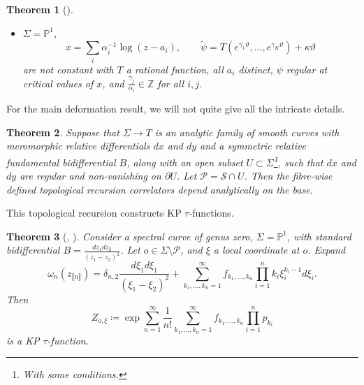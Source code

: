 \documentclass[10pt,a4paper,oneside,no-math,reqno]{amsart}%
\theoremstyle{plain}
\newtheorem{theorem}{Theorem}[section]
\theoremstyle{definition}
\theoremstyle{remark}
\numberwithin{equation}{section}
\renewcommand{\theta}{\vartheta}
\newcommand{\mb}[1]{\mathbb{#1}}
\newcommand{\mc}[1]{\mathcal{#1}}
\newcommand{\1}{\mathds{1}}
\newcommand{\Z}{\mb{Z}}
\renewcommand{\P}{\mb{P}}
\newcommand{\<}{\langle}
\renewcommand{\>}{\rangle}
\newcommand{\del}{\partial}
\begin{document}
\begin{theorem}[{\cite[Section 6]{ABDKS24}}]
\begin{itemize}
        are not constant with all $ a_i$ distinct and $ R $ a rational function which is regular at the $ a_i$. 
        \item $ \Sigma = \P^1$,
        \begin{equation}
            x
            = 
            \sum_i \alpha_i^{-1} \log (z - a_i),
            \qquad
            \tilde{\psi}  
            = 
            T ( e^{\gamma_1 \theta}, \dotsc, e^{\gamma_K \theta}) + \kappa \theta 
        \end{equation} 
        are not constant with $T $ a rational function, all $ a_i $ distinct, $ \psi $ regular at critical values of $ x$, and $ \frac{\gamma_j}{\alpha_i} \in \Z $ for all $ i,j$.
    \end{itemize}
\end{theorem}

For the main deformation result, we will not quite give all the intricate details.

\begin{theorem}\label{TRLimits}
    Suppose that $ \Sigma \to T $ is an analytic family of smooth curves with meromorphic relative differentials $ dx$ and $ dy$ and a symmetric relative fundamental bidifferential $ B$, along with an open subset $ U \subset \Sigma$\footnote{With some conditions.}, such that $ dx$ and $ dy $ are regular and non-vanishing on $ \del U$. Let $ \mc{P} = \mc{S} \cap U$. Then the fibre-wise defined topological recursion correlators depend analytically on the base.
\end{theorem}

This topological recursion constructs KP $\tau$-functions. 

\begin{theorem}[{\cite{ABDKS24KP0}, \cite[Theorem 6.4]{ABDKS25}}]
    Consider a spectral curve of genus zero, $ \Sigma = \P^1$, with standard bidifferential $ B = \frac{dz_1 dz_2}{(z_1 - z_2)^2}$. Let $ o \in \Sigma \setminus \mc{P}$, and $ \xi$ a local coordinate at $ o$. Expand
    \begin{equation}
        \omega_n (z_{\llbracket n \rrbracket} )
        =
        \delta_{n,2} \frac{d\xi_1 d\xi_1}{(\xi_1 - \xi_2)^2}
        +
        \sum_{k_1, \dotsc, k_n = 1}^\infty f_{k_1, \dotsc, k_n} \prod_{i=1}^n k_i \xi_i^{k_i-1} d\xi_i.
    \end{equation}
    Then
    \begin{equation}
        Z_{o,\xi}
        \coloneqq
        \exp \sum_{n=1}^\infty \frac{1}{n!} \sum_{k_1, \dotsc, k_n = 1}^\infty f_{k_1, \dotsc, k_n} \prod_{i=1}^n p_{k_i}
    \end{equation}
    is a KP $\tau$-function.
\end{theorem}
\end{document}
